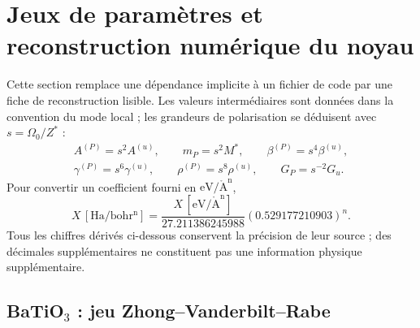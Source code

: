 \section{Jeux de paramètres et reconstruction numérique du noyau}
\label{sec:core_parameter_sets}

Cette section remplace une dépendance implicite à un fichier de code par une
fiche de reconstruction lisible. Les valeurs intermédiaires sont données dans
la convention du mode local ; les grandeurs de polarisation se déduisent avec
$s=\Omega_0/Z^*$ :
\begin{equation}
\begin{gathered}
A^{(P)}=s^2A^{(u)},\qquad
m_P=s^2M^*,\qquad
\beta^{(P)}=s^4\beta^{(u)},\\
\gamma^{(P)}=s^6\gamma^{(u)},\qquad
\rho^{(P)}=s^8\rho^{(u)},\qquad
G_P=s^{-2}G_u .
\end{gathered}
\label{eq:core_parameter_scaling}
\end{equation}
Pour convertir un coefficient fourni en
$\mathrm{eV/\mathring A^n}$,
\begin{equation}
X\,[\mathrm{Ha/bohr^n}]
=\frac{X\,[\mathrm{eV/\mathring A^n}]}{27.211386245988}
(0.529177210903)^n .
\label{eq:core_ev_angstrom_conversion}
\end{equation}
Tous les chiffres dérivés ci-dessous conservent la précision de leur source ;
des décimales supplémentaires ne constituent pas une information physique
supplémentaire.

\subsection{BaTiO$_3$ : jeu Zhong--Vanderbilt--Rabe}

